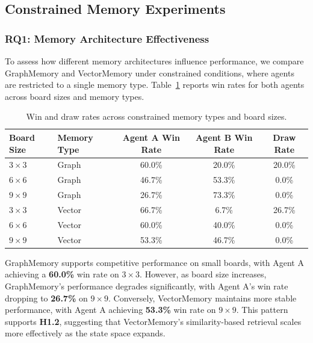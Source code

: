 \documentclass[10pt]{article}
\begin{document}
\subsection{Constrained Memory Experiments}

\subsubsection{RQ1: Memory Architecture Effectiveness}

To assess how different memory architectures influence performance, we compare GraphMemory and VectorMemory under constrained conditions, where agents are restricted to a single memory type. Table~\ref{tab:winrates} reports win rates for both agents across board sizes and memory types.

\begin{table}[h]
\centering
\small
\caption{Win and draw rates across constrained memory types and board sizes.}
\begin{tabular}{@{}llccc@{}}
\toprule
Board Size & Memory Type & Agent A Win Rate & Agent B Win Rate & Draw Rate \\
\midrule
$3 \times 3$ & Graph  & 60.0\% & 20.0\% & 20.0\% \\
$6 \times 6$ & Graph  & 46.7\% & 53.3\% & 0.0\% \\
$9 \times 9$ & Graph  & 26.7\% & 73.3\% & 0.0\% \\
$3 \times 3$ & Vector & 66.7\% & 6.7\%  & 26.7\% \\
$6 \times 6$ & Vector & 60.0\% & 40.0\% & 0.0\% \\
$9 \times 9$ & Vector & 53.3\% & 46.7\% & 0.0\% \\
\bottomrule
\end{tabular}
\label{tab:winrates}
\end{table}

GraphMemory supports competitive performance on small boards, with Agent A achieving a \textbf{60.0\%} win rate on $3\times3$. However, as board size increases, GraphMemory's performance degrades significantly, with Agent A's win rate dropping to \textbf{26.7\%} on $9\times9$. Conversely, VectorMemory maintains more stable performance, with Agent A achieving \textbf{53.3\%} win rate on $9\times9$. This pattern supports \textbf{H1.2}, suggesting that VectorMemory's similarity-based retrieval scales more effectively as the state space expands.
\end{document}

